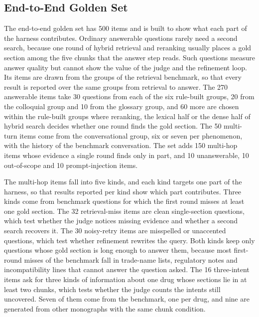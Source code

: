 
\subsection{End-to-End Golden Set}\label{sec:golden}

The end-to-end golden set has 500 items and is built to show what each part of the harness contributes. Ordinary answerable questions rarely need a second search, because one round of hybrid retrieval and reranking usually places a gold section among the five chunks that the answer step reads. Such questions measure answer quality but cannot show the value of the judge and the refinement loop. Its items are drawn from the groups of the retrieval benchmark, so that every result is reported over the same groups from retrieval to answer. The 270 answerable items take 30 questions from each of the six rule-built groups, 20 from the colloquial group and 10 from the glossary group, and 60 more are chosen within the rule-built groups where reranking, the lexical half or the dense half of hybrid search decides whether one round finds the gold section. The 50 multi-turn items come from the conversational group, six or seven per phenomenon, with the history of the benchmark conversation. The set adds 150 multi-hop items whose evidence a single round finds only in part, and 10 unanswerable, 10 out-of-scope and 10 prompt-injection items.

The multi-hop items fall into five kinds, and each kind targets one part of the harness, so that results reported per kind show which part contributes. Three kinds come from benchmark questions for which the first round misses at least one gold section. The 32 retrieval-miss items are clean single-section questions, which test whether the judge notices missing evidence and whether a second search recovers it. The 30 noisy-retry items are misspelled or unaccented questions, which test whether refinement rewrites the query. Both kinds keep only questions whose gold section is long enough to answer them, because most first-round misses of the benchmark fall in trade-name lists, regulatory notes and incompatibility lines that cannot answer the question asked. The 16 three-intent items ask for three kinds of information about one drug whose sections lie in at least two chunks, which tests whether the judge counts the intents still uncovered. Seven of them come from the benchmark, one per drug, and nine are generated from other monographs with the same chunk condition.

